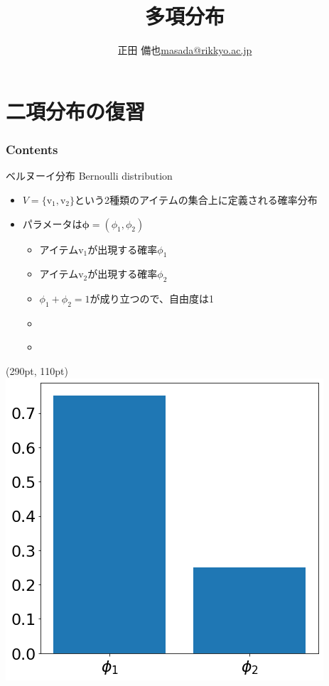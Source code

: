 \documentclass[aspectratio=169,unicode,dvipdfmx,14pt]{beamer}
\title{ \\多項分布}
\author{\texorpdfstring{正田 備也\newline\href{mailto:masada@rikkyo.ac.jp}{masada@rikkyo.ac.jp}}{正田 備也}}
\date{}
\begin{document}
\begin{frame}
\titlepage
\end{frame}


\section{二項分布の復習}

\begin{frame}\frametitle{Contents}
\Large \tableofcontents[currentsection]
\end{frame}

\begin{frame}{ベルヌーイ分布 Bernoulli distribution}
\begin{itemize}
\item $V=\{\mbox{v}_1,\mbox{v}_2\}$という2種類のアイテムの集合上に定義される確率分布
\item パラメータは$\bm{\phi} = (\phi_1, \phi_2)$
\begin{itemize}
\item アイテム$\mbox{v}_1$が出現する確率$\phi_1$
\item アイテム$\mbox{v}_2$が出現する確率$\phi_2$
\item $\phi_1 + \phi_2=1$が成り立つので、自由度は1
\item[] \
\item[] \
\end{itemize}
\end{itemize}
\begin{textblock*}{0.4\linewidth}(290pt, 110pt)
    \centering
    \includegraphics[width=0.8\linewidth]{bernoulli}
\end{textblock*}
\end{frame}
\end{document}
